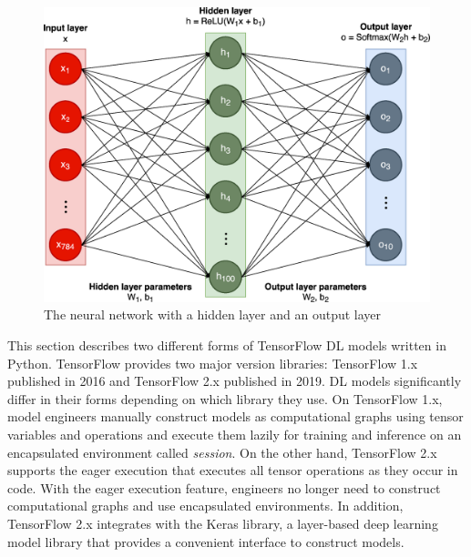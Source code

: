 \begin{figure}[ht!]\centering
  \includegraphics[width=1\textwidth]{Fig1.eps}
  \caption{The neural network with a hidden layer and an output layer}
\label{fig:back:model}
\end{figure}

This section describes two different forms of TensorFlow DL models written in
Python.
TensorFlow provides two major version libraries: TensorFlow 1.x published in
2016 and TensorFlow 2.x published in 2019. 
DL models significantly differ in their forms depending on which library
they use. 
On TensorFlow 1.x, model engineers manually construct models as computational
graphs using tensor variables and operations and execute them lazily  for
training and inference on an encapsulated environment
called {\it session}.
On the other hand, TensorFlow 2.x supports the eager execution that executes
all tensor operations as they occur in code. 
With the eager execution feature, engineers no longer need to construct
computational graphs and use encapsulated environments.
In addition, TensorFlow 2.x integrates with the Keras library, a layer-based
deep learning model library that provides a convenient interface to construct
models.

